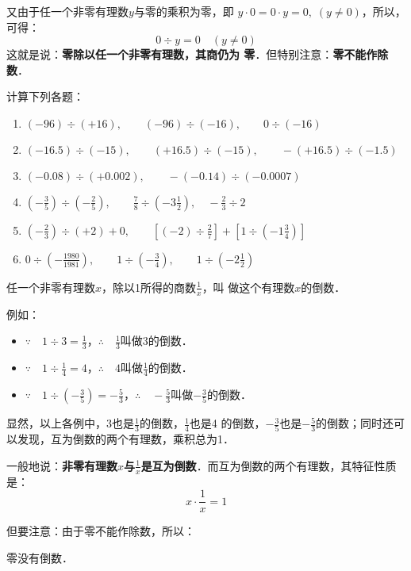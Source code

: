 又由于任一个非零有理数$y$与零的乘积为零，即
$y\cdot 0=0\cdot y=0,\; (y\ne 0)$，所以，可得：
\[0\div y=0\quad  (y\ne 0)\]
这就是说：\textbf{零除以任一个非零有理数，其商仍为
	零}．但特别注意：\textbf{零不能作除数}．


\begin{ex}
	计算下列各题：
	\begin{enumerate}
		\item $(-96)\div (+16),\qquad (-96)\div (-16),\qquad 0\div (-16)$
		\item $(-16.5)\div (-15),\qquad (+16.5)\div (-15),\qquad -(+16.5)\div (-1.5)$
		\item $(-0.08)\div(+0.002),\qquad -(-0.14)\div (-0.0007)$
		\item $\left(-\frac{3}{5}\right)\div \left(-\frac{2}{5}\right),\qquad \frac{7}{8}\div \left(-3\frac{1}{2}\right),\quad -\frac{2}{3}\div 2$
		\item $\left(-\frac{2}{3}\right)\div (+2) +0,\qquad \left[(-2)\div \frac{2}{7}\right]+\left[1\div\left(-1\frac{3}{4}\right)\right]$
		\item $0\div \left(-\frac{1980}{1981}\right),\qquad 1\div\left(-\frac{3}{4}\right),\qquad 1\div\left(-2\frac{1}{2}\right)$
	\end{enumerate}
\end{ex}

\begin{blk}{}
	任一个非零有理数$x$，除以1所得的商数$\frac{1}{x}$，叫
	做这个有理数$x$的倒数．
\end{blk}

例如：
\begin{itemize}
	\item $\because\quad 1\div 3=\frac{1}{3}$，\qquad $\therefore\quad \frac{1}{3}$叫做3的倒数．
	\item $\because\quad 1\div \frac{1}{4}=4$，\qquad $\therefore\quad 4$叫做$\frac{1}{4}$的倒数．
	\item $\because\quad 1\div \left(-\frac{3}{5}\right)=-\frac{5}{3}$，\qquad  $\therefore\quad -\frac{5}{3}$叫做$-\frac{3}{5}$的倒数．
\end{itemize}

显然，以上各例中，3也是$\frac{1}{3}$的倒数，$\frac{1}{4}$也是4
的倒数，$-\frac{3}{5}$也是$-\frac{5}{3}$的倒数；同时还可以发现，互为倒数的两个有理数，乘积总为1．

一般地说：\textbf{非零有理数$x$与$\frac{1}{x}$是互为倒数}．而互为倒数的两个有理数，其特征性质是：
\[x\cdot \frac{1}{x}=1\]

但要注意：由于零不能作除数，所以：
\begin{blk}{}
	零没有倒数．
\end{blk}

